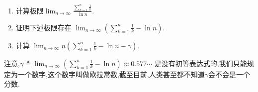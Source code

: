 \documentclass[../../main.tex]{subfiles}%
\begin{document}
\begin{example}\label{example:8.61846546}
\begin{enumerate}[(1)]
\item 计算极限\(\lim_{n \to \infty} \frac{\sum\limits_{k = 1}^{n} \frac{1}{k}}{\ln n}\).

\item\label{example:8.61846546-2} 证明下述极限存在
\(\lim_{n \to \infty} \left(\sum\limits_{k = 1}^{n} \frac{1}{k} - \ln n\right)\).

\item 计算
\(\lim_{n \to \infty} n \left(\sum\limits_{k = 1}^{n} \frac{1}{k} - \ln n - \gamma\right)\).
\end{enumerate}
\end{example}
\begin{note}
注意,\(\gamma \triangleq \lim_{n \to \infty} \left(\sum\limits_{k = 1}^{n} \frac{1}{k} - \ln n\right) \approx 0.577\cdots\)
是没有初等表达式的,我们只能规定为一个数字,这个数字叫做欧拉常数,截至目前,人类甚至都不知道\(\gamma\)会不会是一个分数.
\end{note}
\end{document}
